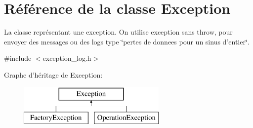 \hypertarget{class_exception}{\section{Référence de la classe Exception}
\label{class_exception}
}


La classe représentant une exception. On utilise exception sans throw, pour envoyer des messages ou des logs type \char`\"{}pertes de donnees pour un sinus d'entier\char`\"{}.  




{\ttfamily \#include $<$exception\-\_\-log.\-h$>$}

Graphe d'héritage de Exception\-:\begin{figure}[H]
\begin{center}
\leavevmode
\includegraphics[height=2.000000cm]{class_exception}
\end{center}
\end{figure}
